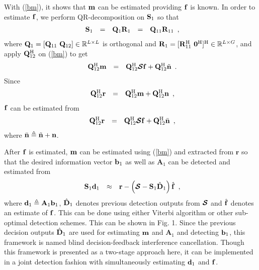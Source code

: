 \documentclass[a4paper,10pt,fleqn, twocolumn]{IEEETran}
\newcommand{\br}{{\mathbf r}}
\newcommand{\bA}{{\mathbf A}}
\newcommand{\bb}{{\bf b}}
\newcommand{\bd}{{\bf d}}
\newcommand{\bm}{{\bf m}}
\newcommand{\bn}{{\bf n}}
\newcommand{\bbf}{{\bf f}}
\newcommand{\bS}{{\bf S}}
\newcommand{\bD}{{\bf D}}
\newcommand{\bQ}{{\bf Q}}
\newcommand{\bR}{{\bf R}}
\newcommand{\bzero}{{\bf 0}}
\newcommand{\bcS}{{\mbox {\boldmath ${\cal S}$}}}
\begin{document}
With (\ref{bm}), it shows that $\bm$ can be estimated providing
$\bbf$ is known. In order to estimate $\bbf$, we perform
QR-decomposition on $\bS_1$ so that~\cite{Huff91,Verd98}
\begin{equation}
\begin{array}{rcccl}
\bS_1&=&\bQ_1\bR_1&=&\bQ_{11}\bR_{11}
\end{array},
\end{equation}
\noindent where $\bQ_1=\left[\bQ_{11}\
\bQ_{12}\right]\in\mathbb{R}^{L\times L}$ is orthogonal and
$\bR_1=[\bR_{11}^{\rm H}\ \bzero^{\rm H}]^{\rm
H}\in\mathbb{R}^{L\times G}$, and apply $\bQ_{12}^{\rm H}$ on
(\ref{bm}) to get
\begin{equation}
\begin{array}{rcl}
\bQ_{12}^{\rm H}\bm&=&\bQ_{12}^{\rm H}\bcS\bbf+\bQ_{12}^{\rm
H}\tilde\bn
\end{array}.
\end{equation}
\noindent Since
\begin{equation}\hspace{-0.0in}
\begin{array}{rcl}
\bQ_{12}^{\rm H}\br&=&\bQ_{12}^{\rm H}\bm + \bQ_{12}^{\rm H}\bn
\end{array},
\end{equation}
\noindent $\bbf$ can be estimated from
\begin{equation}\hspace{-0.0in}
\begin{array}{rcl}
\bQ_{12}^{\rm H}\br&=&\bQ_{12}^{\rm H}\bcS\bbf+\bQ_{12}^{\rm
H}\bar\bn
\end{array},\label{f2}
\end{equation}
\noindent where $\bar\bn\triangleq\tilde\bn+\bn$.

After $\bbf$ is estimated, $\bm$ can be estimated using (\ref{bm})
and extracted from $\br$ so that the desired information vector
$\bb_1$ as well as $\bA_1$ can be detected and estimated from
\begin{equation}
\begin{array}{rcl}
\bS_1\bd_1&\approx&\br-\left(\bcS-\bS_1\hat\bD_1\right)\hat{\bbf}
\end{array},\label{br_bm}
\end{equation}
\noindent where $\bd_1\triangleq\bA_1\bb_1$, $\hat\bD_1$ denotes
previous detection outputs from $\bcS$ and $\hat{\bbf}$ denotes an
estimate of $\bbf$. This can be done using either Viterbi
algorithm or other sub-optimal detection schemes. This can be
shown in Fig. 1. Since the previous decision outputs $\hat\bD_1$
are used for estimating $\bm$ and $\bA_1$ and detecting $\bb_1$,
this framework is named blind decision-feedback interference
cancellation. Though this framework is presented as a two-stage
approach here, it can be implemented in a joint detection fashion
with simultaneously estimating $\bd_1$ and $\bbf$.
\begin{figure} \label{DFIC}
\end{figure}
\end{document}
